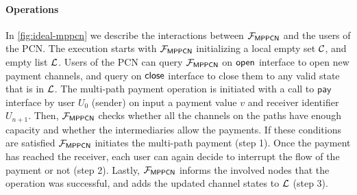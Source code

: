 \paragraph{Operations}
In \cref{fig:ideal-mppcn} we describe the interactions between $\mathcal{F}_{\mathsf{MPPCN}}$ and the 
users of the PCN. The execution starts with $\mathcal{F}_{\mathsf{MPPCN}}$ initializing a local empty 
set $\mathcal{C}$, and empty list $\mathcal{L}$. Users of the PCN can query $\mathcal{F}_{\mathsf{MPPCN}}$ on $\mathsf{open}$ 
interface to open new payment channels, and query on $\mathsf{close}$ interface to close them to any 
valid state that is in $\mathcal{L}$. The multi-path payment operation is initiated with a call to 
$\mathsf{pay}$ interface by user $U_0$ (sender) on input a payment value $v$ and receiver 
identifier $U_{n+1}$. Then, $\mathcal{F}_{\mathsf{MPPCN}}$ checks whether all the channels on the paths 
have enough capacity and whether the intermediaries allow the payments. If these conditions are 
satisfied $\mathcal{F}_{\mathsf{MPPCN}}$ initiates the multi-path payment (step 1). Once the payment has 
reached the receiver, each user can again decide to interrupt the flow of the payment or not 
(step 2). Lastly, $\mathcal{F}_{\mathsf{MPPCN}}$ informs the involved nodes that the operation was 
successful, and adds the updated channel states to $\mathcal{L}$ (step 3).

